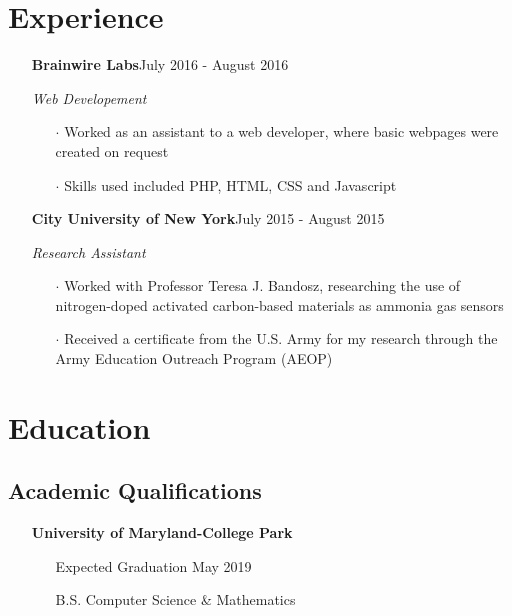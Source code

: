 \documentclass[11pt,letterpaper]{moderncv}
\begin{document}
\makecvtitle
\vspace{-36pt}
\section{Experience}


\begin{itemize}

	\item[]{\textbf{Brainwire Labs}\hfill {July 2016 - August 2016}}
	\vspace{-10pt}
	\item[]{\textit{Web Developement}}
	\vspace{-8pt}
	\begin{itemize}
		\item[$\cdot$]{Worked as an assistant to a web developer, where basic webpages were created on request}
		\vspace{-4pt}
		\item[$\cdot$]{Skills used included PHP, HTML, CSS and Javascript}
	\end{itemize}
	\vspace{-10pt}
	\item[]{\textbf{City University of New York}\hfill {July 2015 - August 2015}}
	\vspace{-10pt}
	\item[]{\textit{Research Assistant} }
	\vspace{-8pt}
	\begin{itemize}
		\item[$\cdot$]{Worked with Professor Teresa J. Bandosz, researching the use of nitrogen-doped activated carbon-based materials as ammonia gas sensors}
		\vspace{-4pt}
		\item[$\cdot$]{Received a certificate from the U.S. Army for my research through the Army Education Outreach Program (AEOP)}
	\end{itemize}

\end{itemize}
\vspace{-16pt}
\section{Education}
\subsection{Academic Qualifications}


\begin{itemize}

	\item[]{\textbf{University of Maryland-College Park}}
	\vspace{-8pt}
	\begin{itemize}
		\item[]{{Expected Graduation} \hfill May 2019}
		\vspace{-6pt}
		\item[]{{B.S.} \hfill Computer Science \& Mathematics}
		\vspace{0pt}
	\end{itemize}
	\vspace{-6pt}
\end{itemize}
\end{document}
